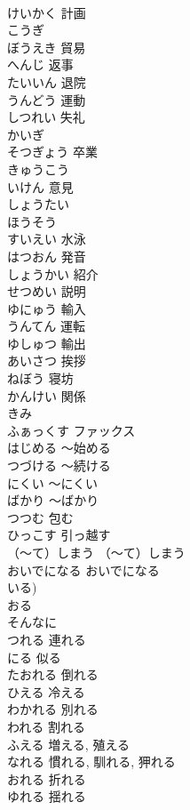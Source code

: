 \documentclass[8pt]{extreport}
\begin{document}
\begin{CJK}{UTF8}{min}
\\	けいかく	計画
\\	こうぎ	
\\	ぼうえき	貿易
\\	へんじ	返事
\\	たいいん	退院
\\	うんどう	運動
\\	しつれい	失礼
\\	かいぎ	
\\	そつぎょう	卒業
\\	きゅうこう	
\\	いけん	意見
\\	しょうたい	
\\	ほうそう	
\\	すいえい	水泳
\\	はつおん	発音
\\	しょうかい	紹介
\\	せつめい	説明
\\	ゆにゅう	輸入
\\	うんてん	運転
\\	ゆしゅつ	輸出
\\	あいさつ	挨拶
\\	ねぼう	寝坊
\\	かんけい	関係
\\	きみ	
\\	ふぁっくす	ファックス
\\	はじめる	～始める
\\	つづける	～続ける
\\	にくい	～にくい
\\	ばかり	～ばかり
\\	つつむ	包む
\\	ひっこす	引っ越す
\\	（～て）しまう	（～て）しまう
\\	おいでになる	おいでになる
\\	いる) 
\\	おる	
\\	そんなに	
\\	つれる	連れる
\\	にる	似る
\\	たおれる	倒れる
\\	ひえる	冷える
\\	わかれる	別れる
\\	われる	割れる
\\	ふえる	増える, 殖える
\\	なれる	慣れる, 馴れる, 狎れる
\\	おれる	折れる
\\	ゆれる	揺れる

\end{CJK}
\end{document}

